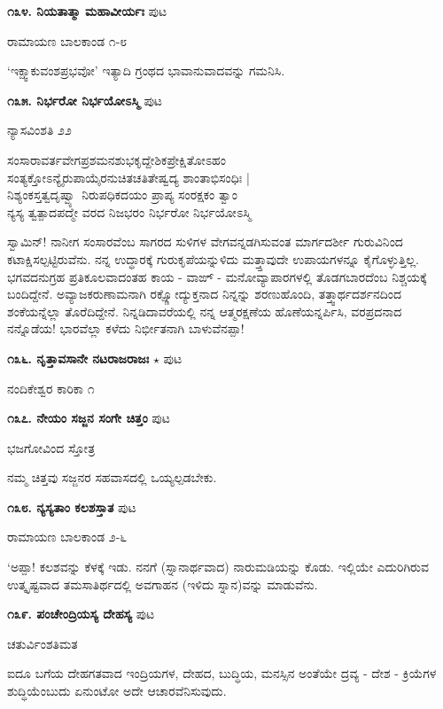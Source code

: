 {\medskip
\noindent\textbf{೧೩೪. ನಿಯತಾತ್ಮಾ ಮಹಾವೀರ್ಯಃ} \hfill ಪುಟ \pageref{247b}

\hfill ರಾಮಾಯಣ ಬಾಲಕಾಂಡ ೧-೮

`ಇಕ್ಷ್ವಾಕುವಂಶಪ್ರಭವೋ' ಇತ್ಯಾದಿ ಗ್ರಂಥದ ಭಾವಾನುವಾದವನ್ನು ಗಮನಿಸಿ.

\medskip
\noindent\textbf{೧೩೫. ನಿರ್ಭರೋ ನಿರ್ಭಯೋಽಸ್ಮಿ} \hfill ಪುಟ \pageref{115}

\hfill ನ್ಯಾಸವಿಂಶತಿ ೨೨

\begin{shloka}
ಸಂಸಾರಾವರ್ತವೇಗಪ್ರಶಮನಶುಭಕೃದ್ದೇಶಿಕಪ್ರೇಕ್ಷಿತೋಽಹಂ\\
ಸಂತ್ಯಕ್ತೋಽನ್ಯೈರುಪಾಯೈರನುಚಿತಚತಿತೇಷ್ವದ್ಯ ಶಾಂತಾಭಿಸಂಧಿಃ |\\
ನಿಶ್ಯಂಕಸ್ತತ್ವದೃಷ್ವ್ಯಾ ನಿರುಪಧಿಕದಯಂ ಪ್ರಾಪ್ಯ ಸಂರಕ್ಷಕಂ ತ್ವಾಂ\\
ನ್ಯಸ್ಯ ತ್ವತ್ಪಾದಪದ್ಮೇ ವರದ ನಿಜಭರಂ ನಿರ್ಭರೋ ನಿರ್ಭಯೋಽಸ್ಮಿ \\
\end{shloka}

ಸ್ವಾಮಿನ್! ನಾನೀಗ ಸಂಸಾರವೆಂಬ ಸಾಗರದ ಸುಳಿಗಳ ವೇಗವನ್ನಡಗಿಸುವಂತ ಮಾರ್ಗದರ್ಶೀ ಗುರುವಿನಿಂದ ಕಟಾಕ್ಷಿಸಲ್ಪಟ್ಟಿರುವೆನು. ನನ್ನ ಉದ್ಧಾರಕ್ಕೆ ಗುರುಕೃಪೆಯನ್ನುಳಿದು ಮತ್ತ್ತಾವುದೇ ಉಪಾಯಗಳನ್ನೂ ಕೈಗೊಳ್ಳುತ್ತಿಲ್ಲ. ಭಗವದನುಗ್ರಹ ಪ್ರತಿಕೂಲವಾದಂತಹ ಕಾಯ - ವಾಙ್ - ಮನೋವ್ಯಾಪಾರಗಳಲ್ಲಿ ತೊಡಗಬಾರದೆಂಬ ನಿಶ್ಚಯಕ್ಕೆ ಬಂದಿದ್ದೇನೆ. ಅವ್ಯಾಜಕರುಣಾಮನಾಗಿ ರಕ್ಷ್ಣೋದ್ಯುಕ್ತನಾದ ನಿನ್ನನ್ನು ಶರಣುಹೊಂದಿ, ತತ್ತ್ವಾರ್ಥದರ್ಶನದಿಂದ ಶಂಕೆಯನ್ನೆಲ್ಲಾ ತೊರೆದಿದ್ದೇನೆ. ನಿನ್ನಡಿದಾವರೆಯಲ್ಲಿ ನನ್ನ ಆತ್ಮರಕ್ಷಣೆಯ ಹೊಣೆಯನ್ನರ್ಪಿಸಿ, ವರಪ್ರದನಾದ ನನ್ನೊಡೆಯ! ಭಾರವೆಲ್ಲಾ ಕಳೆದು ನಿರ್ಭೀತನಾಗಿ ಬಾಳುವೆನಪ್ಪಾ!

\medskip
\noindent\textbf{೧೩೬. ನೃತ್ತಾವಸಾನೇ ನಟರಾಜರಾಜಃ} $\star$ \hfill ಪುಟ \pageref{30}

\hfill ನಂದಿಕೇಶ್ವರ ಕಾರಿಕಾ ೧

\medskip
\noindent\textbf{೧೩೭. ನೇಯಂ ಸಜ್ಜನ ಸಂಗೇ ಚಿತ್ತಂ} \hfill ಪುಟ \pageref{83}

\hfill ಭಜಗೋವಿಂದ ಸ್ತೋತ್ರ

ನಮ್ಮ ಚಿತ್ತವು ಸಜ್ಜನರ ಸಹವಾಸದಲ್ಲಿ ಒಯ್ಯಲ್ಪಡಬೇಕು.

\medskip
\noindent\textbf{೧೩೮. ನ್ಯಸ್ಯತಾಂ ಕಲಶಸ್ತಾತ} \hfill ಪುಟ \pageref{198}

\hfill ರಾಮಾಯಣ ಬಾಲಕಾಂಡ ೨-೬

`ಅಪ್ಪಾ! ಕಲಶವನ್ನು ಕೆಳಕ್ಕೆ ಇಡು. ನನಗೆ (ಸ್ನಾನಾರ್ಥವಾದ) ನಾರುಮಡಿಯನ್ನು ಕೊಡು. ಇಲ್ಲಿಯೇ ಎದುರಿಗಿರುವ ಉತ್ಕೃಷ್ಟವಾದ ತಮಸಾತಿರ್ಥದಲ್ಲಿ ಅವಗಾಹನ (ಇಳಿದು ಸ್ನಾನ)ವನ್ನು ಮಾಡುವೆನು.

\medskip
\noindent\textbf{೧೩೯. ಪಂಚೇಂದ್ರಿಯಸ್ಯ ದೇಹಸ್ಯ} \hfill ಪುಟ \pageref{139}

\hfill ಚತುರ್ವಿಂಶತಿಮತ

ಐದೂ ಬಗೆಯ ದೇಹಗತವಾದ ಇಂದ್ರಿಯಗಳ, ದೇಹದ, ಬುದ್ಧಿಯ, ಮನಸ್ಸಿನ ಅಂತೆಯೇ ದ್ರವ್ಯ - ದೇಶ - ಕ್ರಿಯೆಗಳ ಶುದ್ಧಿಯೆಂಬುದು ಏನುಂಟೋ ಅದೇ ಆಚಾರವೆನಿಸುವುದು. 

}
